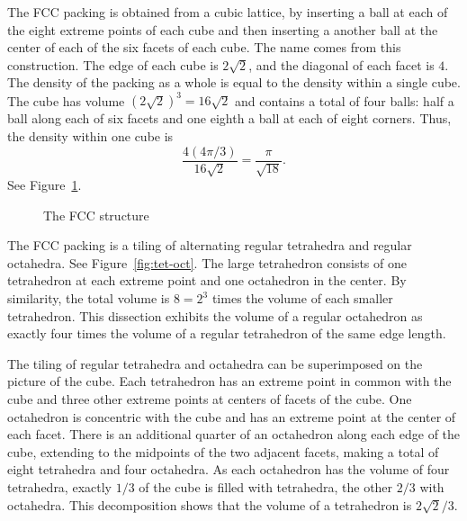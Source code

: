 The FCC packing is  obtained from a cubic
lattice, by inserting a ball at each of the eight extreme points of
each cube and then inserting a another ball at the center of each
of the six facets of each cube.  The name  comes from this
construction.  The edge of each cube is $2\sqrt2$, and the diagonal of
each facet is $4$.  
  The density of the packing as a whole 
is equal to the density within a single cube.  The cube has volume
$(2\sqrt2)^3 = 16\sqrt2$  and contains a total of four balls: half a
ball along each of six facets and one eighth a ball at each of eight
corners.  Thus, the density within one cube is
   \begin{displaymath}
   \frac{   4 (4\pi/3)}{16\sqrt2} = \frac{\pi}{\sqrt{18}}.
   \end{displaymath}
See Figure~\ref{fig:fcc-cube}.

\begin{figure}[htb]
  \centering
  \caption{The FCC structure}
  \label{fig:fcc-cube}
\end{figure}


The FCC packing is a tiling of alternating regular tetrahedra and
regular octahedra.  See Figure~\ref{fig:tet-oct}.  The large tetrahedron consists of  one
tetrahedron at each extreme point and one octahedron in the center. By
similarity, the total volume is $8 = 2^3$ times the volume of each
smaller tetrahedron. This dissection exhibits the volume of a regular
octahedron as exactly four times the volume of a regular tetrahedron
of the same edge length.

The tiling of regular tetrahedra and octahedra can be
superimposed on the picture of the cube.  Each tetrahedron has an extreme point
in common with the cube and three other extreme points at centers of facets
of the cube.   One octahedron is concentric with the cube and has an extreme
point at the center of each facet.  There is an
additional quarter of an octahedron along each edge of the cube, extending to the
midpoints of the two adjacent facets, making a total of eight
tetrahedra and four octahedra.  As each octahedron has the volume of
four tetrahedra, exactly $1/3$ of the cube is filled with tetrahedra,
the other $2/3$ with octahedra.  This decomposition shows that the
volume of a tetrahedron is $2\sqrt2/3$.

